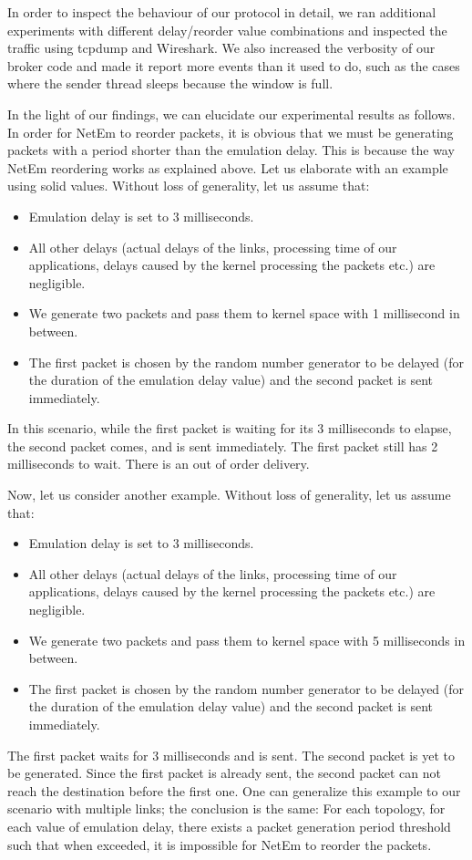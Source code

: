 \documentclass[conference]{IEEEtran}
\begin{document}
In order to inspect the behaviour of our protocol in detail, we ran additional
experiments with different delay/reorder value combinations
and inspected the traffic using tcpdump and Wireshark.
We also increased the verbosity of our broker code and made it report more events
than it used to do, such as the cases where the sender thread sleeps because
the window is full.

In the light of our findings, we can elucidate our experimental results as follows.
In order for NetEm to reorder packets, it is obvious that we must be generating
packets with a period shorter than the emulation delay. This is because the way
NetEm reordering works as explained above. Let us elaborate with an example using
solid values. Without loss of generality, let us assume that:
\begin{itemize}
    \item
        Emulation delay is set to 3 milliseconds.
    \item
        All other delays (actual delays of the links, processing time of our applications,
        delays caused by the kernel processing the packets etc.) are negligible.
    \item
        We generate two packets and pass them to kernel space with 1 millisecond
        in between.
    \item
        The first packet is chosen by the random number generator to be delayed
        (for the duration of the emulation delay value) and the second packet is
        sent immediately.
\end{itemize}
In this scenario, while the first packet is waiting for its 3 milliseconds to elapse,
the second packet comes, and is sent immediately. The first packet still has
2 milliseconds to wait. There is an out of order delivery.

Now, let us consider another example. Without loss of generality, let us assume that:
\begin{itemize}
    \item
        Emulation delay is set to 3 milliseconds.
    \item
        All other delays (actual delays of the links, processing time of our applications,
        delays caused by the kernel processing the packets etc.) are negligible.
    \item
        We generate two packets and pass them to kernel space with 5 milliseconds
        in between.
    \item
        The first packet is chosen by the random number generator to be delayed
        (for the duration of the emulation delay value) and the second packet is
        sent immediately.
\end{itemize}
The first packet waits for 3 milliseconds and is sent. The second packet is yet to
be generated. Since the first packet is already sent, the second packet can not reach
the destination before the first one. One can generalize this example to our scenario
with multiple links; the conclusion is the same:
For each topology, for each value of emulation delay, there exists a packet
generation period threshold such that when exceeded, it is impossible for NetEm to reorder
the packets.
\end{document}
